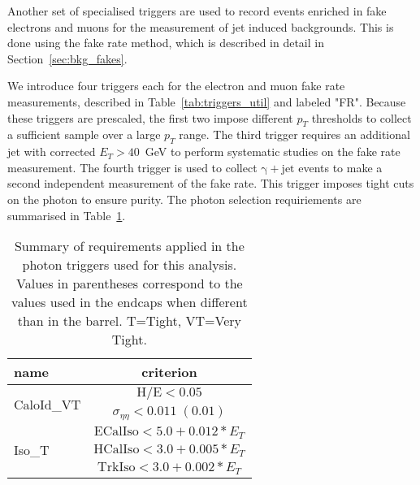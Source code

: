 Another set of specialised triggers are used to record events
enriched in fake electrons and muons for the measurement of jet induced backgrounds.
This is done using the fake rate method, which is described in detail in
Section~\ref{sec:bkg_fakes}.

We introduce four triggers each for the electron and muon fake rate measurements,
described in Table~\ref{tab:triggers_util} and labeled "FR".
Because these triggers are prescaled, the first two impose different $p_T$ thresholds 
to collect a sufficient sample over a large $p_T$ range.
The third trigger requires an additional jet with corrected $E_{T}>40$~GeV
to perform systematic studies on the fake rate measurement.
The fourth trigger is used to collect $\mathrm{\gamma+jet}$ events to
make a second independent measurement of the fake rate.
This trigger imposes tight cuts on the photon to ensure purity.
The photon selection requiriements are summarised in Table~\ref{tab:PhotonPlusLeptonTriggerCuts}.

\begin{table}[htb]
 \caption{Summary of requirements applied in the photon triggers used for this analysis. 
Values in parentheses correspond to the values used in the endcaps when different than in
the barrel. T=Tight, VT=Very Tight.}
    \vspace{5pt}
  \label{tab:PhotonPlusLeptonTriggerCuts}
  \centering
  \begin{tabular}{l||c}
    \hline
    name                        &  criterion \\
    \hline \hline
    \multirow{2}{*}{CaloId\_VT} & $\mathrm{H/E < 0.05 }$ \\
                                & $\sigma_{\eta\eta}\mathrm{< 0.011\;(0.01)}$ \\
    \hline \hline
    \multirow{3}{*}{Iso\_T}     & $\mathrm{ECalIso} < 5.0 + 0.012*E_{T} $ \\
                                & $\mathrm{HCalIso} < 3.0 + 0.005*E_{T} $ \\
                                & $\mathrm{TrkIso}  < 3.0 + 0.002*E_{T} $ \\
    \hline
  \end{tabular}
\end{table}

